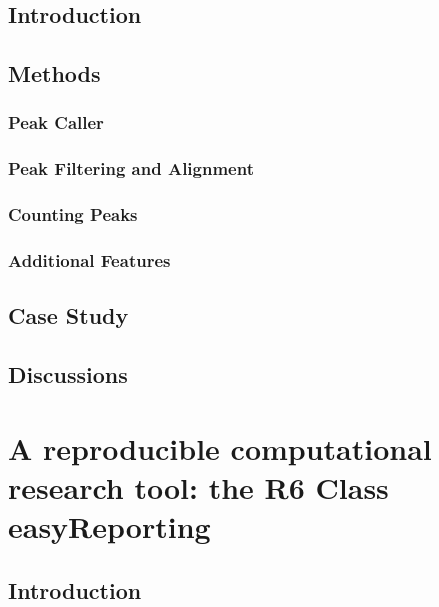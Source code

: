 \documentclass[b5paper, oneside, british, intoc, bibliograph=totoc, index=totoc, BCOR10mm, twoside, openright]{book}
\numberwithin{equation}{section}
\numberwithin{figure}{section}
\begin{document}
\section{Introduction} \label{sec:descan2intro}

\section{Methods} \label{sec:descan2methods}

\subsection{Peak Caller} \label{sec:descan2peakcall}

\subsection{Peak Filtering and Alignment} \label{sec:descan2filtering}

\subsection{Counting Peaks} \label{sec:descan2peakcounts}

\subsection{Additional Features} \label{sec:descan2addfeat}

\section{Case Study} \label{sec:descan2results}

\section{Discussions} \label{sec:descan2next}



\chapter{A reproducible computational research tool: the R6 Class easyReporting}

\section{Introduction}

\end{document}
